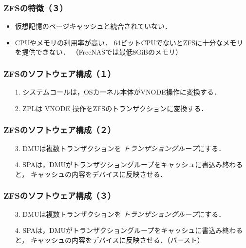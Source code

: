 \documentclass[unicode]{beamer}                   %
\begin{document}
\begin{frame}
  \frametitle{ZFSの特徴（３）}
  \begin{itemize}
  \item 仮想記憶のページキャッシュと統合されていない．
  \item CPUやメモリの利用率が高い．
    64ビットCPUでないとZFSに十分なメモリを提供できない．
    （FreeNASでは最低8GiBのメモリ）
  \end{itemize}
  \vfill
\end{frame}

\begin{frame}[fragile]
  \frametitle{ZFSのソフトウェア構成（１）}
  \begin{enumerate}
  \item[1.] システムコールは，OSカーネル本体がVNODE操作に変換する．
  \item[2.] ZPLは VNODE 操作をZFSのトランザクションに変換する．
  \end{enumerate}  
  \vfill
\end{frame}

\begin{frame}[fragile]
  \frametitle{ZFSのソフトウェア構成（２）}
  \begin{enumerate}
  \item[3.] DMUは複数トランザクションを
    \emph{トランザショングループ}にする．
  \item[4.] SPAは，DMUがトランザクショングループをキャッシュに書込み終わると，
    キャッシュの内容をデバイスに反映させる．
  \end{enumerate}  
  \vfill
\end{frame}

\begin{frame}[fragile]
  \frametitle{ZFSのソフトウェア構成（３）}
  \begin{enumerate}
  \item[3.] DMUは複数トランザクションを
    \emph{トランザショングループ}にする．
  \item[4.] SPAは，DMUがトランザクショングループをキャッシュに書込み終わると，
    キャッシュの内容をデバイスに反映させる．（バースト）
  \end{enumerate}  
  \vfill
\end{frame}
\end{document}

